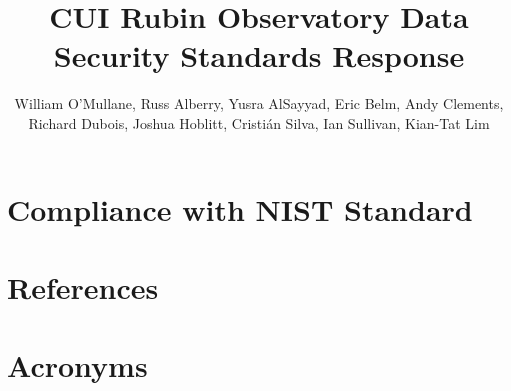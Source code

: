 \documentclass[DM,authoryear,toc]{lsstdoc}
\title{CUI Rubin Observatory Data Security Standards  Response}
\author{%
William O'Mullane,
Russ Alberry,
Yusra AlSayyad,
Eric Belm,
Andy Clements,
Richard Dubois,
Joshua Hoblitt,
Cristi\'{a}n Silva,
Ian Sullivan,
Kian-Tat Lim
}
\date{\vcsDate}
\begin{document}
\maketitle


\newpage
\appendix

\section{Compliance with NIST Standard}\label{sec:compliance}


\newpage
\section{References} \label{sec:bib}
\renewcommand{\refname}{} %


\section{Acronyms} \label{sec:acronyms}

\end{document}
